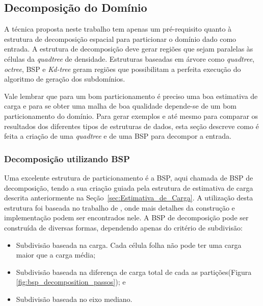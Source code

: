 \subsection{Decomposição do Domínio}\label{sec:Decomposicao_dominio}

A técnica proposta neste trabalho tem apenas um pré-requisito quanto à estrutura de decomposição espacial para particionar o domínio dado como entrada. A estrutura de decomposição deve gerar regiões que sejam paralelas às células da \textit{quadtree} de densidade. Estruturas baseadas em árvore como \textit{quadtree}, \textit{octree}, BSP e \textit{Kd-tree} geram regiões que possibilitam a perfeita execução do algoritmo de geração dos subdomínios.

Vale lembrar que para um bom particionamento é preciso uma boa estimativa de carga e para se obter uma malha de boa qualidade depende-se de um bom particionamento do domínio. Para gerar exemplos e até mesmo para comparar os resultados dos diferentes tipos de estruturas de dados, esta seção descreve como é feita a criação de uma \textit{quadtree} e de uma BSP para decompor a entrada.

\subsubsection{Decomposição utilizando BSP}

Uma excelente estrutura de particionamento é a BSP, aqui chamada de BSP de decomposição, tendo a sua criação guiada pela estrutura de estimativa de carga descrita anteriormente na Seção~\ref{sec:Estimativa_de_Carga}. A utilização desta estrutura foi baseada no trabalho de \cite{bib:RepMarkos13}, onde mais detalhes da construção e implementação podem ser encontrados nele. A BSP de decomposição pode ser construída de diversas formas, dependendo apenas do critério de subdivisão:


\begin{itemize}
	\item Subdivisão baseada na carga. Cada célula folha não pode ter uma carga maior que a carga média;
	\item Subdivisão baseada na diferença de carga total de cada as partições(Figura \ref{fig:bsp_decomposition_passos}); e 
	\item Subdivisão baseada no eixo mediano.
\end{itemize}


